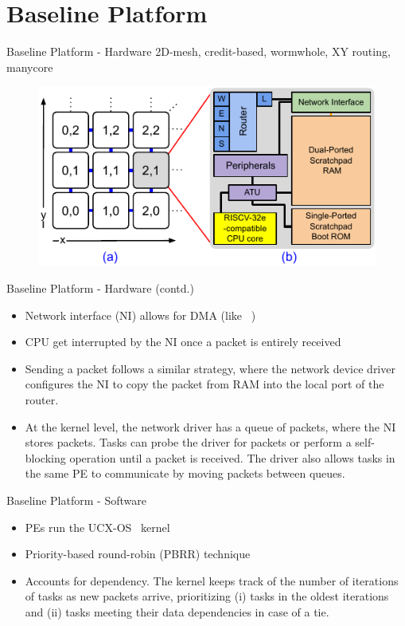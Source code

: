 \section{Baseline Platform}

\begin{frame}{Baseline Platform - Hardware}
    \centering 2D-mesh, credit-based, wormwhole, XY routing, manycore
    \begin{figure}[!ht]
       \centerline{\includegraphics[width=.6\columnwidth]{fig/soc.pdf}}
    \end{figure}    
\end{frame}

\begin{frame}{Baseline Platform - Hardware (contd.)}
	\begin{itemize}
		\item Network interface (NI) allows for DMA (like ~\cite{Ruaro2019Memphis,ruaro_dmni})
		
		\item CPU get interrupted by the NI once a packet is entirely received
		
		\item Sending a packet follows a similar strategy, where the network device driver configures the NI to copy the packet from RAM into the local port of the router. 
		
		\item At the kernel level, the network driver has a queue of packets, where the NI stores packets. Tasks can probe the driver for packets or perform a self-blocking operation until a packet is received. The driver also allows tasks in the same PE to communicate by moving packets between queues.%
	\end{itemize}
\end{frame}


\begin{frame}{Baseline Platform - Software}
    \begin{itemize}
        \item PEs run the UCX-OS~\cite{ucxos:2024} kernel
        \item Priority-based round-robin (PBRR) technique~\cite{Nithya:2023}
        \item Accounts for dependency. The kernel keeps track of the number of iterations of tasks as new packets arrive, prioritizing (i) tasks in the oldest iterations and (ii) tasks meeting their data dependencies in case of a tie.
    \end{itemize}
\end{frame}
